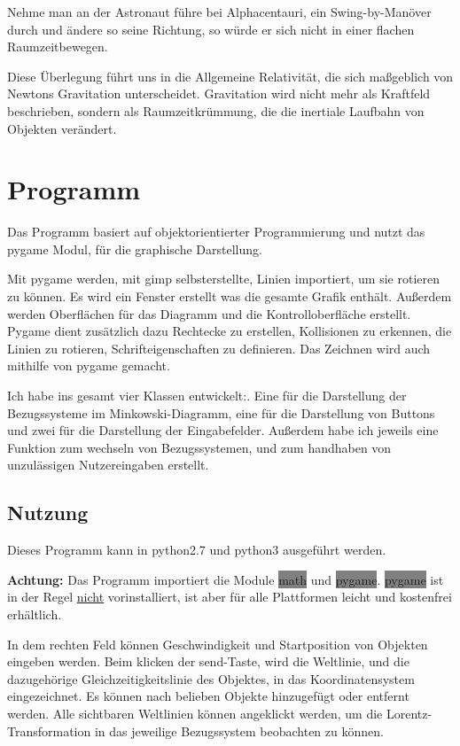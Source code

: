 \documentclass[12pt]{article}
\begin{document}
Nehme man an der Astronaut führe bei Alphacentauri, ein Swing-by-Manöver durch und ändere so seine Richtung, so würde er sich nicht in einer flachen Raumzeitbewegen.

Diese Überlegung führt uns in die Allgemeine Relativität, die sich maßgeblich von Newtons Gravitation unterscheidet.
Gravitation wird nicht mehr als Kraftfeld beschrieben, sondern als Raumzeitkrümmung, die die inertiale Laufbahn von Objekten verändert.
\newpage
\section{Programm}
Das Programm basiert auf objektorientierter Programmierung und nutzt das pygame Modul, für die graphische Darstellung.

Mit pygame werden, mit gimp selbsterstellte, Linien importiert, um sie rotieren zu können.
Es wird ein Fenster erstellt was die gesamte Grafik enthält.
Außerdem werden Oberflächen für das Diagramm und die Kontrolloberfläche erstellt.
Pygame dient zusätzlich dazu Rechtecke zu erstellen, Kollisionen zu erkennen, die Linien zu rotieren, Schrifteigenschaften zu definieren.
Das Zeichnen wird auch mithilfe von pygame gemacht.

Ich habe ins gesamt vier Klassen entwickelt:.
Eine für die Darstellung der Bezugssysteme im Minkowski-Diagramm, eine für die Darstellung von Buttons und zwei für die Darstellung der Eingabefelder.
Außerdem habe ich jeweils eine Funktion zum wechseln von Bezugssystemen, und zum handhaben von unzulässigen Nutzereingaben erstellt.
\subsection{Nutzung}
Dieses Programm kann in python2.7 und python3 ausgeführt werden.

\textbf{Achtung:} Das Programm importiert die Module \colorbox{gray}{math} und \colorbox{gray}{pygame}.
\colorbox{gray}{pygame} ist in der Regel \underline{nicht} vorinstalliert, ist aber für alle Plattformen leicht und kostenfrei erhältlich.

In dem rechten Feld können Geschwindigkeit und Startposition von Objekten eingeben werden.
Beim klicken der send-Taste, wird die Weltlinie, und die dazugehörige Gleichzeitigkeitslinie des Objektes, in das Koordinatensystem eingezeichnet.
Es können nach belieben Objekte hinzugefügt oder entfernt werden.
Alle sichtbaren Weltlinien können angeklickt werden, um die Lorentz-Transformation in das jeweilige Bezugssystem beobachten zu können.
\\
\end{document}
